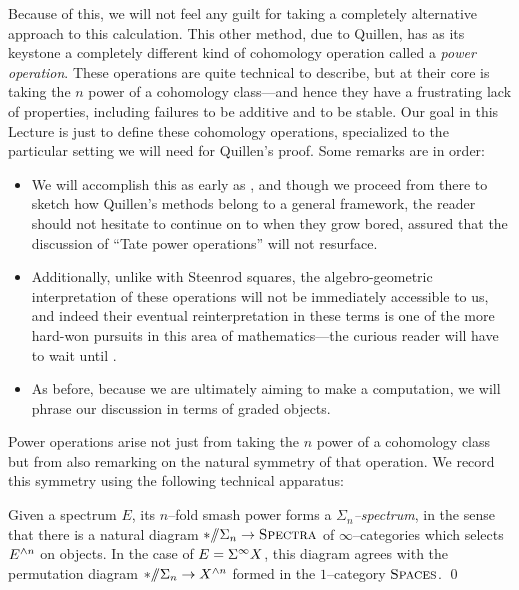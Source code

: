 Because of this, we will not feel any guilt for taking a completely alternative approach to this calculation.  This other method, due to Quillen, has as its keystone a completely different kind of cohomology operation called a \textit{power operation}.  These operations are quite technical to describe, but at their core is taking the \(n\){\th} power of a cohomology class---and hence they have a frustrating lack of properties, including failures to be additive and to be stable.  Our goal in this Lecture is just to define these cohomology operations, specialized to the particular setting we will need for Quillen's proof.  Some remarks are in order:
\begin{itemize}
\item We will accomplish this as early as , and though we proceed from there to sketch how Quillen's methods belong to a general framework, the reader should not hesitate to continue on to  when they grow bored, assured that the discussion of ``Tate power operations'' will not resurface.
\item Additionally, unlike with Steenrod squares, the algebro-geometric interpretation of these operations will not be immediately accessible to us, and indeed their eventual reinterpretation in these terms is one of the more hard-won pursuits in this area of mathematics---the curious reader will have to wait until .
\item As before, because we are ultimately aiming to make a computation, we will phrase our discussion in terms of graded objects.
\end{itemize}

Power operations arise not just from taking the \(n\){\th} power of a cohomology class but from also remarking on the natural symmetry of that operation.  We record this symmetry using the following technical apparatus:
\begin{lemma}
Given a spectrum \(E\), its \(n\)--fold smash power forms a \textit{\(\Sigma_n\)--spectrum}, in the sense that there is a natural diagram \(* /\!\!/ \Sigma_n \to \normalfont\textsc{Spectra}\) of \(\infty\)--categories which selects \(E^{\wedge n}\) on objects.  In the case of $E = \Sigma^\infty X$, this diagram agrees with the permutation diagram \(* /\!\!/ \Sigma_n \to X^{\wedge n}\) formed in the \(1\)--category \(\normalfont\textsc{Spaces}\). \qed
\end{lemma}

